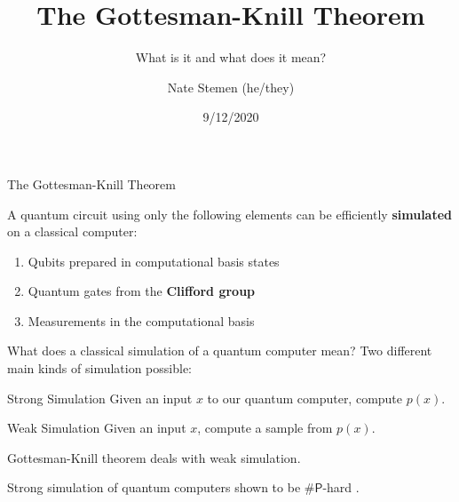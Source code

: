 \documentclass[11pt,aspectratio=1610]{beamer}
\title{The Gottesman-Knill Theorem}
\subtitle{What is it and what does it mean?}
\date{9/12/2020}
\author{Nate Stemen (he/they)}
\institute{QIC 710 Final Project}
\begin{document}
\maketitle

\begin{frame}{The Gottesman-Knill Theorem}
	\begin{theorem}
		A quantum circuit using only the following elements can be efficiently \textbf{simulated} on a classical computer:
		\begin{enumerate}
			\item Qubits prepared in computational basis states
			\item Quantum gates from the \textbf{Clifford group}
			\item Measurements in the computational basis
		\end{enumerate}
	\end{theorem}
\end{frame}

\begin{frame}{What does a classical simulation of a quantum computer mean?}
	Two different main kinds of simulation possible:\pause
	\begin{exampleblock}{Strong Simulation}
		Given an input $x$ to our quantum computer, compute $p(x)$.
	\end{exampleblock}\pause
	\begin{exampleblock}{Weak Simulation}
		Given an input $x$, compute a sample from $p(x)$.
	\end{exampleblock}\pause
	Gottesman-Knill theorem deals with weak simulation.

	Strong simulation of quantum computers shown to be $\#\bm{\mathsf{P}}$-hard \cite{nest}.
\end{frame}
\end{document}
